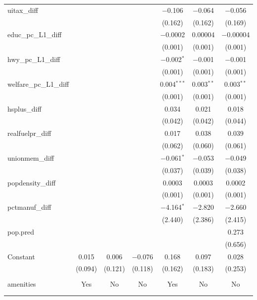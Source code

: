 \begin{table}[!htbp]
\begin{tabular}{@{\extracolsep{5pt}}lcccccc}
  uitax\_diff &  &  &  & $-$0.106 & $-$0.064 & $-$0.056 \\ 
  &  &  &  & (0.162) & (0.162) & (0.169) \\ 
  educ\_pc\_L1\_diff &  &  &  & $-$0.0002 & 0.00004 & $-$0.00004 \\ 
  &  &  &  & (0.001) & (0.001) & (0.001) \\ 
  hwy\_pc\_L1\_diff &  &  &  & $-$0.002$^{*}$ & $-$0.001 & $-$0.001 \\ 
  &  &  &  & (0.001) & (0.001) & (0.001) \\ 
  welfare\_pc\_L1\_diff &  &  &  & 0.004$^{***}$ & 0.003$^{**}$ & 0.003$^{**}$ \\ 
  &  &  &  & (0.001) & (0.001) & (0.001) \\ 
  hsplus\_diff &  &  &  & 0.034 & 0.021 & 0.018 \\ 
  &  &  &  & (0.042) & (0.042) & (0.044) \\ 
  realfuelpr\_diff &  &  &  & 0.017 & 0.038 & 0.039 \\ 
  &  &  &  & (0.062) & (0.060) & (0.061) \\ 
  unionmem\_diff &  &  &  & $-$0.061$^{*}$ & $-$0.053 & $-$0.049 \\ 
  &  &  &  & (0.037) & (0.039) & (0.038) \\ 
  popdensity\_diff &  &  &  & 0.0003 & 0.0003 & 0.0002 \\ 
  &  &  &  & (0.001) & (0.001) & (0.001) \\ 
  pctmanuf\_diff &  &  &  & $-$4.164$^{*}$ & $-$2.820 & $-$2.660 \\ 
  &  &  &  & (2.440) & (2.386) & (2.415) \\ 
  pop.pred &  &  &  &  &  & 0.273 \\ 
  &  &  &  &  &  & (0.656) \\ 
  Constant & 0.015 & 0.006 & $-$0.076 & 0.168 & 0.097 & 0.028 \\ 
  & (0.094) & (0.121) & (0.118) & (0.162) & (0.183) & (0.253) \\ 
 \hline \\[-1.8ex] 
amenities & Yes & No & No & Yes & No & No \\ 
\hline \\[-1.8ex] 
\hline 
\hline \\[-1.8ex] 
\end{tabular} 
\end{table} 
